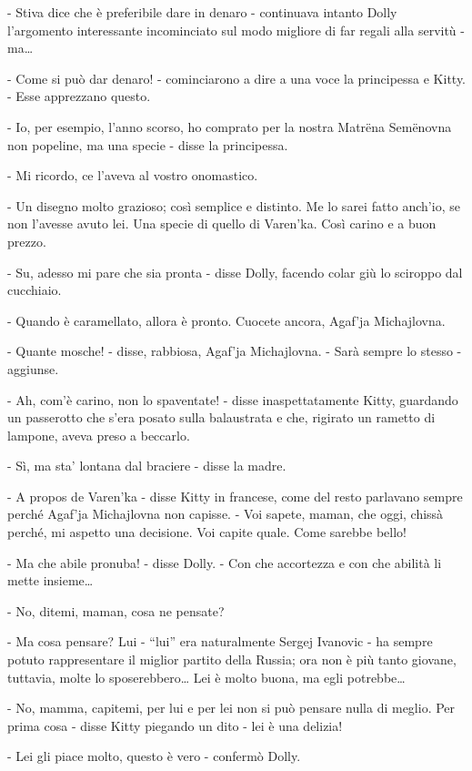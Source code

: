 - Stiva dice che è preferibile dare in denaro - continuava intanto Dolly l'argomento interessante incominciato sul modo migliore di far regali alla servitù - ma\ldots{} 

- Come si può dar denaro! - cominciarono a dire a una voce la principessa e Kitty. - Esse apprezzano questo. 

- Io, per esempio, l'anno scorso, ho comprato per la nostra Matrëna Semënovna non popeline, ma una specie - disse la principessa. 

- Mi ricordo, ce l'aveva al vostro onomastico. 

- Un disegno molto grazioso; così semplice e distinto. Me lo sarei fatto anch'io, se non l'avesse avuto lei. Una specie di quello di Varen'ka. Così carino e a buon prezzo. 

- Su, adesso mi pare che sia pronta - disse Dolly, facendo colar giù lo sciroppo dal cucchiaio. 

- Quando è caramellato, allora è pronto. Cuocete ancora, Agaf'ja Michajlovna. 

- Quante mosche! - disse, rabbiosa, Agaf'ja Michajlovna. - Sarà sempre lo stesso - aggiunse. 

- Ah, com'è carino, non lo spaventate! - disse inaspettatamente Kitty, guardando un passerotto che s'era posato sulla balaustrata e che, rigirato un rametto di lampone, aveva preso a beccarlo. 

- Sì, ma sta' lontana dal braciere - disse la madre. 

- A propos de Varen'ka - disse Kitty in francese, come del resto parlavano sempre perché Agaf'ja Michajlovna non capisse. - Voi sapete, maman, che oggi, chissà perché, mi aspetto una decisione. Voi capite quale. Come sarebbe bello! 

- Ma che abile pronuba! - disse Dolly. - Con che accortezza e con che abilità li mette insieme\ldots{} 

- No, ditemi, maman, cosa ne pensate? 

- Ma cosa pensare? Lui - ``lui'' era naturalmente Sergej Ivanovic - ha sempre potuto rappresentare il miglior partito della Russia; ora non è più tanto giovane, tuttavia, molte lo sposerebbero\ldots{} Lei è molto buona, ma egli potrebbe\ldots{} 

- No, mamma, capitemi, per lui e per lei non si può pensare nulla di meglio. Per prima cosa - disse Kitty piegando un dito - lei è una delizia! 

- Lei gli piace molto, questo è vero - confermò Dolly. 


